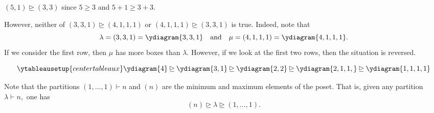 \begin{ex}
	$(5, 1) \unrhd (3, 3)$ since $5 \ge 3$ and $5 + 1 \ge 3 + 3.$

	However, neither of $(3, 3, 1) \unrhd (4, 1, 1, 1)$ or $(4, 1, 1, 1) \unrhd (3, 3, 1)$ is true. Indeed, note that
	\begin{equation*} 
		\lambda = (3, 3, 1) = \ydiagram{3, 3, 1} \andd \mu = (4, 1, 1, 1) = \ydiagram{4, 1, 1, 1}.
	\end{equation*}
	If we consider the first row, then $\mu$ has more boxes than $\lambda.$ However, if we look at the first two rows, then the situation is reversed.
\end{ex}
\begin{ex}
	\begin{equation*} 
		\ytableausetup{centertableaux}
		\ydiagram{4} \unrhd \ydiagram{3, 1} \unrhd \ydiagram{2, 2} \unrhd \ydiagram{2, 1, 1,} \unrhd \ydiagram{1, 1, 1, 1}
	\end{equation*}
\end{ex}
\begin{ex}
	Note that the partitions $(1, \ldots, 1) \vdash n$ and $(n)$ are the minimum and maximum elements of the poset. That is, given any partition $\lambda \vdash n,$ one has
	\begin{equation*} 
		(n) \unrhd \lambda \unrhd (1, \ldots, 1).
	\end{equation*}
\end{ex}

